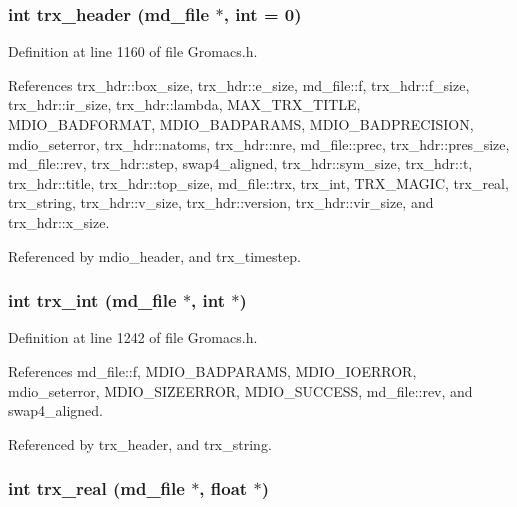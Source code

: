 \subsubsection{\setlength{\rightskip}{0pt plus 5cm}int trx\_\-header ({\bf md\_\-file} $\ast$, int = 0)\hspace{0.3cm}{\tt  [static]}}\label{Gromacs_8h_a43}




Definition at line 1160 of file Gromacs.h.

References trx\_\-hdr::box\_\-size, trx\_\-hdr::e\_\-size, md\_\-file::f, trx\_\-hdr::f\_\-size, trx\_\-hdr::ir\_\-size, trx\_\-hdr::lambda, MAX\_\-TRX\_\-TITLE, MDIO\_\-BADFORMAT, MDIO\_\-BADPARAMS, MDIO\_\-BADPRECISION, mdio\_\-seterror, trx\_\-hdr::natoms, trx\_\-hdr::nre, md\_\-file::prec, trx\_\-hdr::pres\_\-size, md\_\-file::rev, trx\_\-hdr::step, swap4\_\-aligned, trx\_\-hdr::sym\_\-size, trx\_\-hdr::t, trx\_\-hdr::title, trx\_\-hdr::top\_\-size, md\_\-file::trx, trx\_\-int, TRX\_\-MAGIC, trx\_\-real, trx\_\-string, trx\_\-hdr::v\_\-size, trx\_\-hdr::version, trx\_\-hdr::vir\_\-size, and trx\_\-hdr::x\_\-size.

Referenced by mdio\_\-header, and trx\_\-timestep.
\subsubsection{\setlength{\rightskip}{0pt plus 5cm}int trx\_\-int ({\bf md\_\-file} $\ast$, int $\ast$)\hspace{0.3cm}{\tt  [static]}}\label{Gromacs_8h_a44}




Definition at line 1242 of file Gromacs.h.

References md\_\-file::f, MDIO\_\-BADPARAMS, MDIO\_\-IOERROR, mdio\_\-seterror, MDIO\_\-SIZEERROR, MDIO\_\-SUCCESS, md\_\-file::rev, and swap4\_\-aligned.

Referenced by trx\_\-header, and trx\_\-string.
\subsubsection{\setlength{\rightskip}{0pt plus 5cm}int trx\_\-real ({\bf md\_\-file} $\ast$, float $\ast$)\hspace{0.3cm}{\tt  [static]}}\label{Gromacs_8h_a45}




